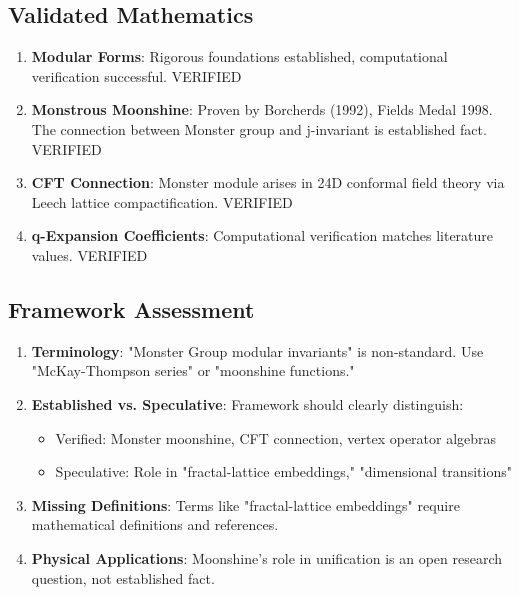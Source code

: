 \subsection{Validated Mathematics}

\begin{enumerate}
    \item \textbf{Modular Forms}: Rigorous foundations established, computational verification successful. \textcolor{validcolor}{VERIFIED}

    \item \textbf{Monstrous Moonshine}: Proven by Borcherds (1992), Fields Medal 1998. The connection between Monster group and j-invariant is established fact. \textcolor{validcolor}{VERIFIED}

    \item \textbf{CFT Connection}: Monster module arises in 24D conformal field theory via Leech lattice compactification. \textcolor{validcolor}{VERIFIED}

    \item \textbf{q-Expansion Coefficients}: Computational verification matches literature values. \textcolor{validcolor}{VERIFIED}
\end{enumerate}

\subsection{Framework Assessment}

\begin{enumerate}
    \item \textbf{Terminology}: "Monster Group modular invariants" is non-standard. Use "McKay-Thompson series" or "moonshine functions."

    \item \textbf{Established vs. Speculative}: Framework should clearly distinguish:
    \begin{itemize}
        \item Verified: Monster moonshine, CFT connection, vertex operator algebras
        \item Speculative: Role in "fractal-lattice embeddings," "dimensional transitions"
    \end{itemize}

    \item \textbf{Missing Definitions}: Terms like "fractal-lattice embeddings" require mathematical definitions and references.

    \item \textbf{Physical Applications}: Moonshine's role in unification is an open research question, not established fact.
\end{enumerate}

